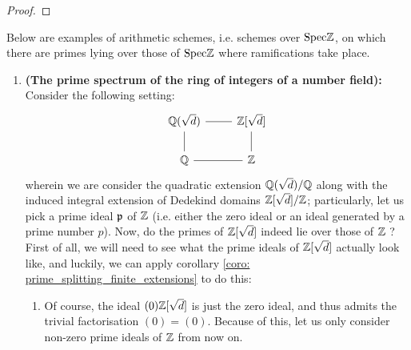             \begin{proposition}
            
            \end{proposition}
                \begin{proof}
                    
                \end{proof}
            
            \begin{example}
                Below are examples of arithmetic schemes, i.e. schemes over $\mathrm{Spec} \mathbb{Z}$, on which there are primes lying over those of $\mathrm{Spec} \mathbb{Z}$ where ramifications take place.
                    \begin{enumerate}
                        \item \textbf{(The prime spectrum of the ring of integers of a number field):} Consider the following setting:
                            $$
                                \begin{tikzcd}
                                	{\Q(\sqrt{d})} & {\Z[\sqrt{d}]} \\
                                	\Q & \Z
                                	\arrow[no head, from=2-1, to=1-1]
                                	\arrow[no head, from=2-2, to=1-2]
                                	\arrow[no head, from=1-1, to=1-2]
                                	\arrow[no head, from=2-1, to=2-2]
                                \end{tikzcd}
                            $$
                        wherein we are consider the quadratic extension $\mathbb{Q}(\sqrt{d})/\mathbb{Q}$ along with the induced integral extension of Dedekind domains $\mathbb{Z}[\sqrt{d}]/\mathbb{Z}$; particularly, let us pick a prime ideal $\mathfrak{p}$ of $\mathbb{Z}$ (i.e. either the zero ideal or an ideal generated by a prime number $p$). Now, do the primes of $\mathbb{Z}[\sqrt{d}]$ indeed lie over those of $\mathbb{Z}$ ? First of all, we will need to see what the prime ideals of $\mathbb{Z}[\sqrt{d}]$ actually look like, and luckily, we can apply corollary \ref{coro: prime_splitting_finite_extensions} to do this:
                            \begin{enumerate}
                                \item Of course, the ideal $(0)\mathbb{Z}[\sqrt{d}]$ is just the zero ideal, and thus admits the trivial factorisation $(0) = (0)$. Because of this, let us only consider non-zero prime ideals of $\mathbb{Z}$ from now on.

\end{enumerate}
\end{enumerate}
\end{example}
